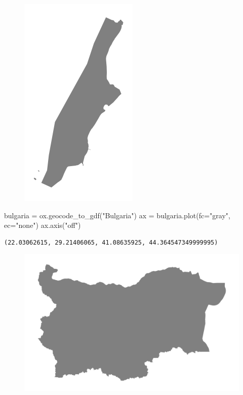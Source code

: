\documentclass[
  letterpaper,
  DIV=11,
  numbers=noendperiod]{scrreprt}
\newenvironment{Shaded}{\begin{snugshade}}{\end{snugshade}}
\newcommand{\NormalTok}[1]{\textcolor[rgb]{0.00,0.23,0.31}{#1}}
\newcommand{\OperatorTok}[1]{\textcolor[rgb]{0.37,0.37,0.37}{#1}}
\newcommand{\StringTok}[1]{\textcolor[rgb]{0.13,0.47,0.30}{#1}}
\begin{document}
\begin{figure}[H]

{\centering \includegraphics{labs/w07_OSM_files/figure-pdf/cell-3-output-2.png}

}

\end{figure}

\begin{Shaded}
\begin{Highlighting}[]
\NormalTok{bulgaria }\OperatorTok{=}\NormalTok{ ox.geocode\_to\_gdf(}\StringTok{"Bulgaria"}\NormalTok{)}
\NormalTok{ax }\OperatorTok{=}\NormalTok{ bulgaria.plot(fc}\OperatorTok{=}\StringTok{"gray"}\NormalTok{, ec}\OperatorTok{=}\StringTok{"none"}\NormalTok{)}
\NormalTok{ax.axis(}\StringTok{"off"}\NormalTok{)}
\end{Highlighting}
\end{Shaded}

\begin{verbatim}
(22.03062615, 29.21406065, 41.08635925, 44.364547349999995)
\end{verbatim}

\begin{figure}[H]

{\centering \includegraphics{labs/w07_OSM_files/figure-pdf/cell-4-output-2.png}

}

\end{figure}
\end{document}
